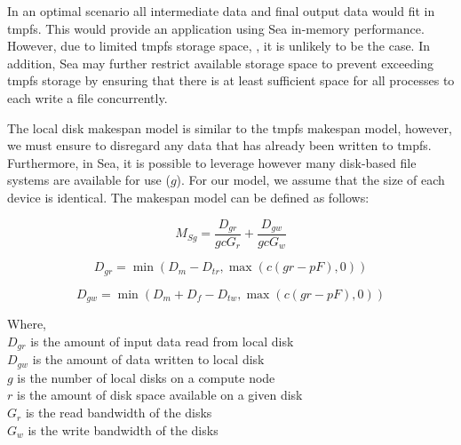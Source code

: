       In an optimal scenario all intermediate data and final output data would
      fit in tmpfs. This would provide an application using Sea in-memory
      performance. However, due to limited tmpfs storage space, , it is unlikely
      to be the case. In addition, Sea may further restrict available storage
      space to prevent exceeding tmpfs storage by ensuring that there is at
      least sufficient space for all processes to each write a file
      concurrently.

      The local disk  makespan model is similar to the tmpfs makespan model,
      however, we must ensure to disregard any data that has already been
      written to tmpfs. Furthermore, in Sea, it is possible to leverage however
      many disk-based file systems are available for use ($g$). For our model,
      we assume that the size of each device is identical. The makespan model
      can be defined as follows:

      \begin{equation}\label{eq:sea-comp:msd}
          M_{Sg} =  \frac{D_{gr}}{gcG_{r}} + \frac{D_{gw}}{gcG_{w}}
      \end{equation}

      \begin{equation*}\label{eq:sea-comp:ddr}
          D_{gr} = \min{(D_{m} - D_{tr}, \max{(c(gr - pF),0)})}
      \end{equation*}

      \begin{equation*}\label{eq:sea-comp:ddw}
          D_{gw} = \min{(D_{m} + D_{f} - D_{tw}, \max{(c(gr - pF),0)})}
      \end{equation*}

      
      Where, \\
      $D_{gr}$ is the amount of input data read from local disk \\
      $D_{gw}$ is the amount of data written to local disk \\
      $g$ is the number of local disks on a compute node \\
      $r$ is the amount of disk space available on a given disk \\
      $G_{r}$ is the read bandwidth of the disks \\
      $G_{w}$ is the write bandwidth of the disks \\

